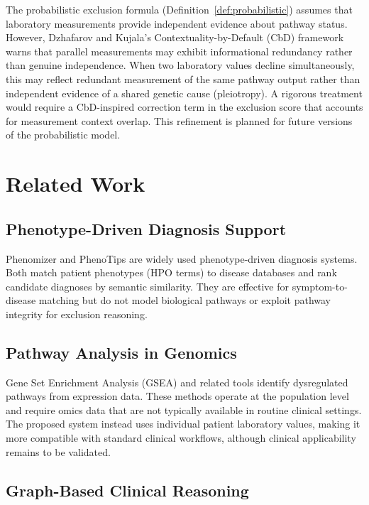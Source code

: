 \documentclass[12pt,a4paper]{article}
\begin{document}
The probabilistic exclusion formula (Definition~\ref{def:probabilistic}) assumes that laboratory measurements provide independent evidence about pathway status. However, Dzhafarov and Kujala's Contextuality-by-Default (CbD) framework \citep{Dzhafarov2016} warns that parallel measurements may exhibit informational redundancy rather than genuine independence. When two laboratory values decline simultaneously, this may reflect redundant measurement of the same pathway output rather than independent evidence of a shared genetic cause (pleiotropy). A rigorous treatment would require a CbD-inspired correction term in the exclusion score that accounts for measurement context overlap. This refinement is planned for future versions of the probabilistic model.

\section{Related Work}
\label{sec:related}

\subsection{Phenotype-Driven Diagnosis Support}

Phenomizer \citep{Kohler2009} and PhenoTips \citep{Girdea2013} are widely used phenotype-driven diagnosis systems. Both match patient phenotypes (HPO terms) to disease databases and rank candidate diagnoses by semantic similarity. They are effective for symptom-to-disease matching but do not model biological pathways or exploit pathway integrity for exclusion reasoning.

\subsection{Pathway Analysis in Genomics}

Gene Set Enrichment Analysis (GSEA) \citep{Subramanian2005} and related tools identify dysregulated pathways from expression data. These methods operate at the population level and require omics data that are not typically available in routine clinical settings. The proposed system instead uses individual patient laboratory values, making it more compatible with standard clinical workflows, although clinical applicability remains to be validated.

\subsection{Graph-Based Clinical Reasoning}
\end{document}

